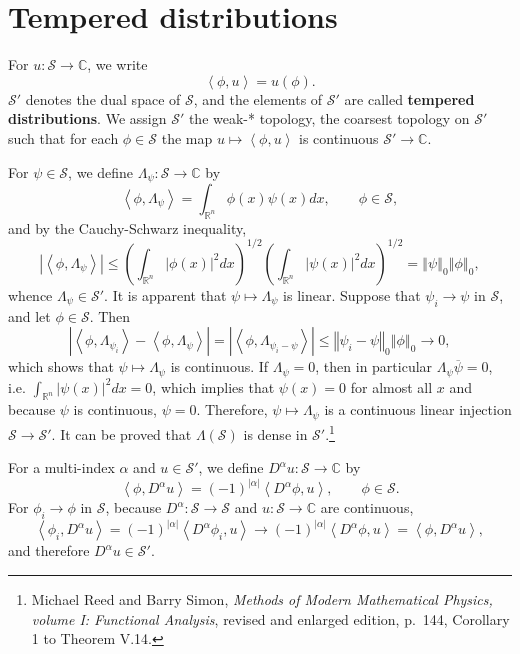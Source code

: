 \documentclass{article}
\newcommand{\inner}[2]{\left\langle #1, #2 \right\rangle}
\newcommand{\norm}[1]{\left\Vert #1 \right\Vert}
\theoremstyle{definition}
\begin{document}
\section{Tempered distributions}
For $u:\mathscr{S} \to \mathbb{C}$, we write
\[
\inner{\phi}{u}=u(\phi).
\]
$\mathscr{S}'$ denotes the dual space of $\mathscr{S}$, and the elements of $\mathscr{S}'$ are called \textbf{tempered distributions}.
We assign $\mathscr{S}'$ the weak-* topology, the coarsest topology on $\mathscr{S}'$ such that  for
each $\phi \in \mathscr{S}$ the map $u \mapsto \inner{\phi}{u}$ is continuous $\mathscr{S}' \to \mathbb{C}$. 

For $\psi \in \mathscr{S}$, we define $\Lambda_\psi:\mathscr{S} \to \mathbb{C}$ by
\[
\inner{\phi}{\Lambda_\psi} = \int_{\mathbb{R}^n} \phi(x) \psi(x) dx,\qquad \phi \in \mathscr{S},
\]
and by the Cauchy-Schwarz inequality,
\[
|\inner{\phi}{\Lambda_\psi}|
\leq \left( \int_{\mathbb{R}^n}  |\phi(x)|^2 dx\right)^{1/2}  \left(\int_{\mathbb{R}^n}  |\psi(x)|^2 dx\right)^{1/2}
=\norm{\psi}_0 \norm{\phi}_0,
\]
whence $\Lambda_\psi \in \mathscr{S}'$. 
It is apparent that $\psi \mapsto \Lambda_\psi$ is linear.
Suppose that $\psi_i \to \psi$ in $\mathscr{S}$, and let $\phi \in \mathscr{S}$. Then
\[
|\inner{\phi}{\Lambda_{\psi_i}} - \inner{\phi}{\Lambda_\psi}| = 
|\inner{\phi}{\Lambda_{\psi_i - \psi}}|
\leq \norm{\psi_i-\psi}_0 \norm{\phi}_0 \to 0,
\]
which shows that  $\psi \mapsto \Lambda_\psi$ is continuous. 
If $\Lambda_\psi = 0$, then
in particular $\Lambda_\psi \overline{\psi}=0$, i.e. $\int_{\mathbb{R}^n} |\psi(x)|^2 dx=0$, which implies that $\psi(x)=0$
for almost all $x$ and because $\psi$ is continuous, $\psi=0$. Therefore,
$\psi \mapsto \Lambda_\psi$ is a continuous linear injection  $\mathscr{S} \to \mathscr{S}'$.
It can be proved that $\Lambda(\mathscr{S})$ is dense in $\mathscr{S}'$.\footnote{Michael Reed and Barry Simon,
{\em Methods of Modern Mathematical Physics, volume I: Functional Analysis}, revised and enlarged edition,
p.~144, Corollary 1 to Theorem V.14.}


For a multi-index $\alpha$ and $u \in \mathscr{S}'$, we define
$D^\alpha u:\mathscr{S} \to \mathbb{C}$ by
\[
\inner{\phi}{D^\alpha u} = (-1)^{|\alpha|} \inner{D^\alpha \phi}{u},\qquad \phi \in \mathscr{S}.
\]
For $\phi_i \to \phi$ in $\mathscr{S}$, because $D^\alpha:\mathscr{S} \to \mathscr{S}$  and $u:\mathscr{S}
\to \mathbb{C}$ are continuous,
\[
\inner{\phi_i}{D^\alpha u}
=(-1)^{|\alpha|} \inner{D^\alpha \phi_i}{u}
\to (-1)^{|\alpha|} \inner{D^\alpha \phi}{u}
=\inner{\phi}{D^\alpha u},
\]
and therefore $D^\alpha u \in \mathscr{S}'$. 
\end{document}
